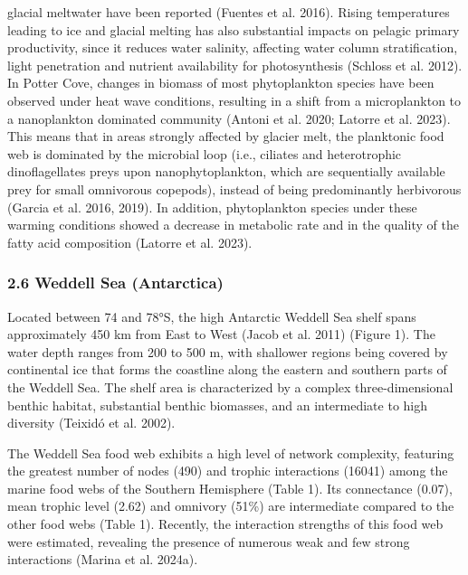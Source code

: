 \documentclass[
]{article}
\begin{document}
glacial meltwater have been reported (Fuentes et al. 2016). Rising
temperatures leading to ice and glacial melting has also substantial
impacts on pelagic primary productivity, since it reduces water
salinity, affecting water column stratification, light penetration and
nutrient availability for photosynthesis (Schloss et al. 2012). In
Potter Cove, changes in biomass of most phytoplankton species have been
observed under heat wave conditions, resulting in a shift from a
microplankton to a nanoplankton dominated community (Antoni et al. 2020;
Latorre et al. 2023). This means that in areas strongly affected by
glacier melt, the planktonic food web is dominated by the microbial loop
(i.e., ciliates and heterotrophic dinoflagellates preys upon
nanophytoplankton, which are sequentially available prey for small
omnivorous copepods), instead of being predominantly herbivorous (Garcia
et al. 2016, 2019). In addition, phytoplankton species under these
warming conditions showed a decrease in metabolic rate and in the
quality of the fatty acid composition (Latorre et al. 2023).

\subsubsection{2.6 Weddell Sea
(Antarctica)}\label{weddell-sea-antarctica}

Located between 74 and 78°S, the high Antarctic Weddell Sea shelf spans
approximately 450 km from East to West (Jacob et al. 2011) (Figure 1).
The water depth ranges from 200 to 500 m, with shallower regions being
covered by continental ice that forms the coastline along the eastern
and southern parts of the Weddell Sea. The shelf area is characterized
by a complex three-dimensional benthic habitat, substantial benthic
biomasses, and an intermediate to high diversity (Teixidó et al. 2002).

The Weddell Sea food web exhibits a high level of network complexity,
featuring the greatest number of nodes (490) and trophic interactions
(16041) among the marine food webs of the Southern Hemisphere (Table 1).
Its connectance (0.07), mean trophic level (2.62) and omnivory (51\%)
are intermediate compared to the other food webs (Table 1). Recently,
the interaction strengths of this food web were estimated, revealing the
presence of numerous weak and few strong interactions (Marina et al.
2024a).
\end{document}
